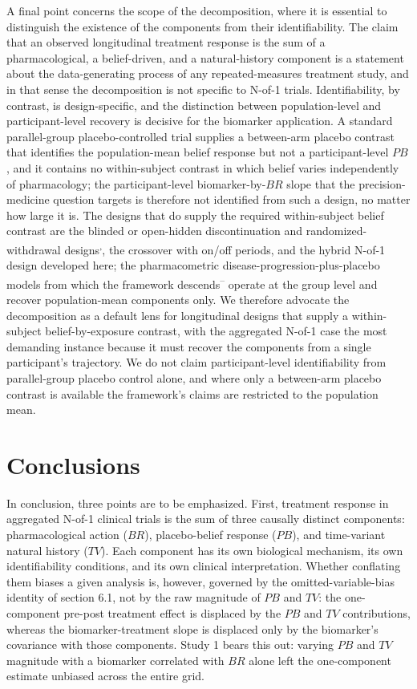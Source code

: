 \documentclass[
  11pt,
]{article}
\begin{document}
A final point concerns the scope of the decomposition, where it is essential
to distinguish the existence of the components from their identifiability. The
claim that an observed longitudinal treatment response is the sum of a
pharmacological, a belief-driven, and a natural-history component is a
statement about the data-generating process of any repeated-measures treatment
study, and in that sense the decomposition is not specific to N-of-1 trials.
Identifiability, by contrast, is design-specific, and the distinction between
population-level and participant-level recovery is decisive for the biomarker
application. A standard parallel-group placebo-controlled trial supplies a
between-arm placebo contrast that identifies the population-mean belief
response but not a participant-level \(PB\), and it contains no within-subject
contrast in which belief varies independently of pharmacology; the
participant-level biomarker-by-\(BR\) slope that the precision-medicine question
targets is therefore not identified from such a design, no matter how large it
is. The designs that do supply the required within-subject belief contrast are
the blinded or open-hidden discontinuation and randomized-withdrawal designs\textsuperscript{,}, the crossover with on/off periods, and the
hybrid N-of-1 design developed here; the pharmacometric
disease-progression-plus-placebo models from which the framework descends\textsuperscript{--} operate at the group level and recover
population-mean components only. We therefore advocate the decomposition as a
default lens for longitudinal designs that supply a within-subject
belief-by-exposure contrast, with the aggregated N-of-1 case the most
demanding instance because it must recover the components from a single
participant's trajectory. We do not claim participant-level identifiability
from parallel-group placebo control alone, and where only a between-arm
placebo contrast is available the framework's claims are restricted to the
population mean.

\section{Conclusions}\label{conclusions}

In conclusion, three points are to be emphasized. First, treatment response in
aggregated N-of-1 clinical trials is the sum of three causally distinct
components: pharmacological action (\(BR\)), placebo-belief response (\(PB\)), and
time-variant natural history (\(TV\)). Each component has its own biological
mechanism, its own identifiability conditions, and its own clinical
interpretation. Whether conflating them biases a given analysis is, however,
governed by the omitted-variable-bias identity of section 6.1, not by the raw
magnitude of \(PB\) and \(TV\): the one-component pre-post treatment effect is
displaced by the \(PB\) and \(TV\) contributions, whereas the biomarker-treatment
slope is displaced only by the biomarker's covariance with those components.
Study 1 bears this out: varying \(PB\) and \(TV\) magnitude with a biomarker
correlated with \(BR\) alone left the one-component estimate unbiased across
the entire grid.
\end{document}
